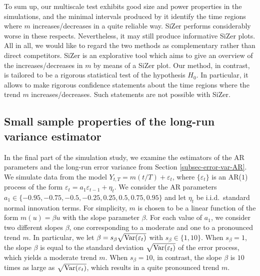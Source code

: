 To sum up, our multiscale test exhibits good size and power properties in the simulations, and the minimal intervals produced by it identify the time regions where $m$ increases/decreases in a quite reliable way. SiZer performs considerably worse in these respects. Nevertheless, it may still produce informative SiZer plots. %
All in all, we would like to regard the two methods as complementary rather than direct competitors. SiZer is an explorative tool which aims to give an overview of the increases/decreases in $m$ by means of a SiZer plot. Our method, in contrast, is tailored to be a rigorous statistical test of the hypothesis $H_0$. In particular, it allows to make rigorous confidence statements about the time regions where the trend $m$ increases/decreases. Such statements are not possible with SiZer. 


\subsection{Small sample properties of the long-run variance estimator}\label{subsec-sim-3}


In the final part of the simulation study, we examine the estimators of the AR parameters and the long-run error variance from Section \ref{subsec-error-var-AR}. We simulate data from the model $Y_{t,T} = m(t/T) + \varepsilon_t$, where $\{ \varepsilon_t\}$ is an AR($1$) process of the form $\varepsilon_t = a_1 \varepsilon_{t-1} + \eta_t$. We consider the AR parameters $a_1 \in \{-0.95,-0.75,-0.5,-0.25,0.25,0.5,0.75,0.95\}$ and let $\eta_t$ be i.i.d.\ standard normal innovation terms. For simplicity, $m$ is chosen to be a linear function of the form $m(u) = \beta u$ with the slope parameter $\beta$. For each value of $a_1$, we consider two different slopes $\beta$, one corresponding to a moderate and one to a pronounced trend $m$. 
In particular, we let $\beta = s_\beta \sqrt{\textnormal{Var}(\varepsilon_t)}$ with $s_\beta \in \{1,10\}$. When $s_\beta = 1$, the slope $\beta$ is equal to the standard deviation $\sqrt{\textnormal{Var}(\varepsilon_t)}$ of the error process, which yields a moderate trend $m$. When $s_\beta = 10$, in contrast, the slope $\beta$ is $10$ times as large as $\sqrt{\textnormal{Var}(\varepsilon_t)}$, which results in a quite pronounced trend $m$. 


